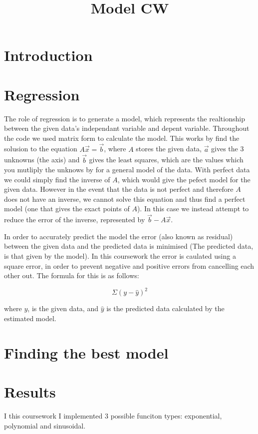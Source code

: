 \message{ !name(report.tex)}\documentclass[]{article}
\title{Model CW}
\begin{document}


\maketitle

\section{Introduction}

\section{Regression}
The role of regression is to generate a model, which represents the realtionship between the given data's independant variable and depent variable. Throughout the code we used matrix form to calculate the model. This works by find the solusion to the equation $A\overrightarrow{x} = \overrightarrow{b}$, where $A$ stores the given data, $\overrightarrow{a}$ gives the 3 unknowns (the axis) and $\overrightarrow{b}$ gives the least squares, which are the values which you mutliply the unknows by for a general model of the data. With perfect data we could simply find the inverse of $A$, which would give the pefect model for the given data. However in the event that the data is not perfect and therefore $A$ does not have an inverse, we cannot solve this equation and thus find a perfect model (one that gives the exact points of $A$). In this case we instead attempt to reduce the error of the inverse, represented by $\overrightarrow{b} - A\overrightarrow{x}$.

In order to accurately predict the model the error (also known as residual) between the given data and the predicted data is minimised (The predicted data, is that given by the model). In this coursework the error is caulated using a square error, in order to prevent negative and positive errors from cancelling each other out. The formula for this is as follows: 

\begin{equation}
  \Sigma (y - \hat{y})^2
\end {equation}

where \(y\), is the given data, and \(\hat{y}\) is the predicted data calculated by the estimated model.

\section{Finding the best model}

\section{Results}
I this coursework I implemented 3 possible funciton types: exponential,
polynomial and sinusoidal.
\end{document}
